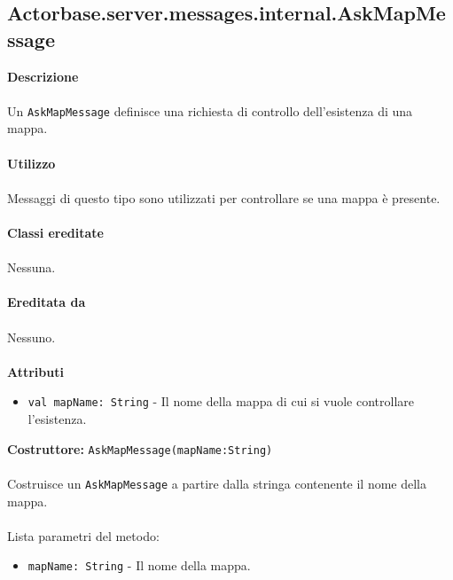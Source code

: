 \documentclass[a4paper]{article}
\begin{document}
	\subsection{Actorbase.server.messages.internal.AskMapMessage}
		\textbf{Descrizione}
			\\ \\
			Un \texttt{AskMapMessage} definisce una richiesta di controllo dell'esistenza di una mappa.
			\\ \\
		\textbf{Utilizzo}
			\\ \\
			Messaggi di questo tipo sono utilizzati per controllare se una mappa è presente.
			\\ \\
		\textbf{Classi ereditate}
			\\ \\
			Nessuna.
			\\ \\
		\textbf{Ereditata da}
			\\ \\
			Nessuno.
			\\ \\
		\textbf{Attributi}
			\begin{itemize}
				\item \texttt{val mapName: String} - Il nome della mappa di cui si vuole controllare l'esistenza.
			\end{itemize}
		\textbf{Costruttore:} \texttt{AskMapMessage(mapName:String)}
		\\ \\
		Costruisce un \texttt{AskMapMessage} a partire dalla stringa contenente il nome della mappa.
		\\ \\
		Lista parametri del metodo:
		\begin{itemize}
			\item \texttt{mapName: String} - Il nome della mappa.
		\end{itemize}
		
\end{document}
